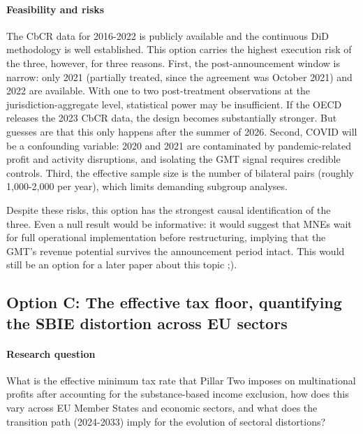 \documentclass[11pt,a4paper]{article}
\begin{document}
\paragraph{Feasibility and risks} The CbCR data for 2016-2022 is publicly available and the continuous DiD methodology is well established. This option carries the highest execution risk of the three, however, for three reasons. First, the post-announcement window is narrow: only 2021 (partially treated, since the agreement was October 2021) and 2022 are available. With one to two post-treatment observations at the jurisdiction-aggregate level, statistical power may be insufficient. If the OECD releases the 2023 CbCR data, the design becomes substantially stronger. But guesses are that this only happens after the summer of 2026. Second, COVID will be a confounding variable: 2020 and 2021 are contaminated by pandemic-related profit and activity disruptions, and isolating the GMT signal requires credible controls. Third, the effective sample size is the number of bilateral pairs (roughly 1,000-2,000 per year), which limits demanding subgroup analyses.

Despite these risks, this option has the strongest causal identification of the three. Even a null result would be informative: it would suggest that MNEs wait for full operational implementation before restructuring, implying that the GMT's revenue potential survives the announcement period intact. This would still be an option for a later paper about this topic ;). 

\subsection{Option C: The effective tax floor, quantifying the SBIE distortion across EU sectors}\label{sec:optionC}

\paragraph{Research question} What is the effective minimum tax rate that Pillar Two imposes on multinational profits after accounting for the substance-based income exclusion, how does this vary across EU Member States and economic sectors, and what does the transition path (2024-2033) imply for the evolution of sectoral distortions?
\end{document}
